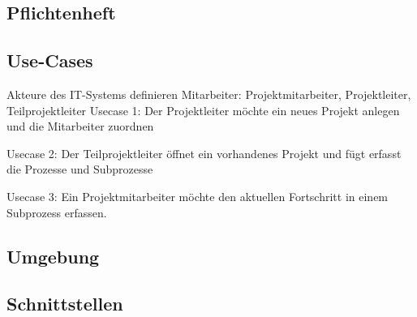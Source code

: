 \subsection{Pflichtenheft}
\subsection{Use-Cases}
Akteure des IT-Systems definieren
Mitarbeiter: Projektmitarbeiter, Projektleiter, Teilprojektleiter
Usecase 1:
Der Projektleiter möchte ein neues Projekt anlegen und die Mitarbeiter zuordnen

Usecase 2:
Der Teilprojektleiter öffnet ein vorhandenes Projekt und fügt erfasst die Prozesse und Subprozesse

Usecase 3:
Ein Projektmitarbeiter möchte den aktuellen Fortschritt in einem Subprozess erfassen.

\subsection{Umgebung}
\subsection{Schnittstellen}